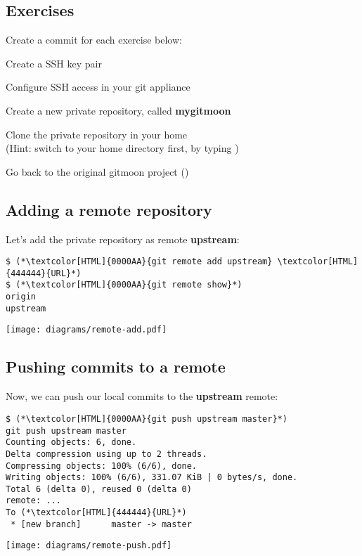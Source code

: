 \subsection{Exercises}
\begin{frame}[fragile]
  \subslidetitle
  Create a commit for each exercise below:
  \begin{exercise}
    \item Create a SSH key pair
    \item Configure SSH access in your git appliance
    \item Create a new private repository, called \textbf{mygitmoon}
    \item Clone the private repository in your home \\
      (Hint: switch to your home directory first, by typing )
    \item Go back to the original gitmoon project ()
  \end{exercise}
\end{frame}

\subsection{Adding a remote repository}
\begin{frame}[fragile]
  \subslidetitle
  Let's add the private repository as remote \textbf{upstream}:
  \begin{lstlisting}
$ (*\textcolor[HTML]{0000AA}{git remote add upstream} \textcolor[HTML]{444444}{URL}*)
$ (*\textcolor[HTML]{0000AA}{git remote show}*)
origin
upstream
\end{lstlisting}
\vspace{1em}
\center \texttt{[image: diagrams/remote-add.pdf]}
\end{frame}

\subsection{Pushing commits to a remote}
\begin{frame}[fragile]
  \subslidetitle
  Now, we can push our local commits to the \textbf{upstream} remote:
  \begin{lstlisting}
$ (*\textcolor[HTML]{0000AA}{git push upstream master}*)
git push upstream master
Counting objects: 6, done.
Delta compression using up to 2 threads.
Compressing objects: 100% (6/6), done.
Writing objects: 100% (6/6), 331.07 KiB | 0 bytes/s, done.
Total 6 (delta 0), reused 0 (delta 0)
remote: ...
To (*\textcolor[HTML]{444444}{URL}*)
 * [new branch]      master -> master
\end{lstlisting}
\vspace{-1.1em}
\center \texttt{[image: diagrams/remote-push.pdf]}
\end{frame}

